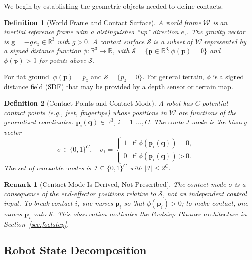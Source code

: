 \documentclass[letterpaper, 10pt, conference]{IEEEtran}
\newtheorem{definition}{Definition}
\newtheorem{remark}{Remark}
\newcommand{\R}{\mathbb{R}}
\newcommand{\bq}{\bm{q}}
\newcommand{\bp}{\bm{p}}
\newcommand{\cW}{\mathcal{W}}
\newcommand{\cS}{\mathcal{S}}
\newcommand{\cI}{\mathcal{I}}
\begin{document}
We begin by establishing the geometric objects needed to define
contacts.

\begin{definition}[World Frame and Contact Surface]\label{def:geometry}
A \emph{world frame} $\cW$ is an inertial reference frame
with a distinguished ``up'' direction $e_z$.
The \emph{gravity vector} is $\bm{g} = -g \, e_z \in \R^3$
with $g > 0$.
A \emph{contact surface} $\cS$ is a subset of $\cW$
represented by a signed distance function
$\phi : \R^3 \to \R$, with $\cS = \{\bp \in \R^3 : \phi(\bp) = 0\}$
and $\phi(\bp) > 0$ for points above $\cS$.
\end{definition}

For flat ground, $\phi(\bp) = p_z$ and $\cS = \{p_z = 0\}$.
For general terrain, $\phi$ is a signed distance field (SDF)
that may be provided by a depth sensor or terrain map.

\begin{definition}[Contact Points and Contact Mode]\label{def:contact}
A robot has $C$ \emph{potential contact points}
(e.g., feet, fingertips) whose positions in $\cW$ are
functions of the generalized coordinates:
$\bp_i(\bq) \in \R^3$, $i = 1, \ldots, C$.
The \emph{contact mode} is the binary vector
\begin{equation}\label{eq:sigma}
  \sigma \in \{0,1\}^C, \quad
  \sigma_i = \begin{cases}
    1 & \text{if } \phi(\bp_i(\bq)) = 0, \\
    0 & \text{if } \phi(\bp_i(\bq)) > 0.
  \end{cases}
\end{equation}
The set of \emph{reachable modes} is
$\cI \subseteq \{0,1\}^C$ with $|\cI| \leq 2^C$.
\end{definition}

\begin{remark}[Contact Mode Is Derived, Not Prescribed]
\label{rem:derived}
The contact mode $\sigma$ is a \emph{consequence} of
the end-effector positions relative to $\cS$,
not an independent control input.
To break contact $i$, one moves $\bp_i$ so that
$\phi(\bp_i) > 0$; to make contact, one moves $\bp_i$
onto $\cS$.
This observation motivates the Footstep Planner architecture
in Section~\ref{sec:footstep}.
\end{remark}

\subsection{Robot State Decomposition}\label{sec:decomposition}
\end{document}
